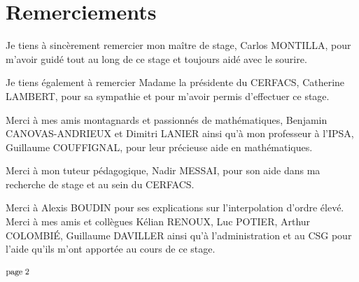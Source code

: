\chapter*{Remerciements}

Je tiens à sincèrement remercier mon maître de stage, Carlos MONTILLA, pour m'avoir guidé tout au long de ce stage et toujours aidé avec le sourire.

\vspace{0.5cm}

Je tiens également à remercier Madame la présidente du CERFACS, Catherine LAMBERT, pour sa sympathie et pour m'avoir permis d'effectuer ce stage. %

Merci à mes amis montagnards et passionnés de mathématiques, Benjamin CANOVAS-ANDRIEUX et Dimitri \mbox{LANIER} ainsi qu'à mon professeur à l'IPSA, Guillaume COUFFIGNAL, pour leur précieuse aide en mathématiques.

Merci à mon tuteur pédagogique, Nadir MESSAI, pour son aide dans ma recherche de stage et au sein du CERFACS.

Merci à Alexis BOUDIN pour ses explications sur l'interpolation d'ordre élevé.
Merci à mes amis et collègues Kélian RENOUX, Luc POTIER, Arthur COLOMBIÉ, Guillaume DAVILLER ainsi qu'à l'administration et au CSG pour l'aide qu'ils m'ont apportée au cours de ce stage.




\vspace*{\fill} %
\begin{center}
    \includegraphics[width=0.067\textwidth]{images/page_2.png}
\end{center}
\vspace*{-13.5cm} %
\vspace*{\fill} %

